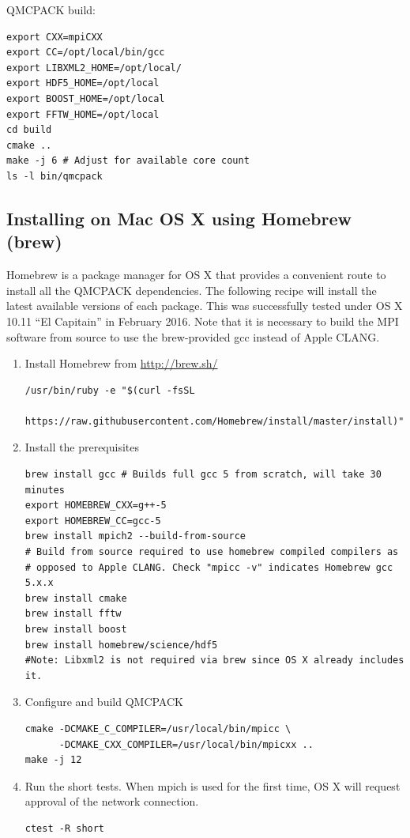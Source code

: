 QMCPACK build:
\begin{verbatim}
export CXX=mpiCXX
export CC=/opt/local/bin/gcc
export LIBXML2_HOME=/opt/local/
export HDF5_HOME=/opt/local
export BOOST_HOME=/opt/local
export FFTW_HOME=/opt/local
cd build
cmake ..
make -j 6 # Adjust for available core count
ls -l bin/qmcpack 
\end{verbatim}

\subsection{Installing on Mac OS X using Homebrew (brew)}
Homebrew is a package manager for OS X that provides a convenient
route to install all the QMCPACK dependencies. The
following recipe will install the latest available versions of each
package. This was successfully tested under OS X 10.11 ``El
Capitain'' in February 2016. Note that it is necessary to build the MPI software from
source to use the brew-provided gcc instead of Apple CLANG.

\begin{enumerate}
\item Install Homebrew from \url{http://brew.sh/}
\begin{verbatim}
/usr/bin/ruby -e "$(curl -fsSL 
    https://raw.githubusercontent.com/Homebrew/install/master/install)"
\end{verbatim}

\item Install the prerequisites
\begin{verbatim}
brew install gcc # Builds full gcc 5 from scratch, will take 30 minutes
export HOMEBREW_CXX=g++-5
export HOMEBREW_CC=gcc-5
brew install mpich2 --build-from-source
# Build from source required to use homebrew compiled compilers as
# opposed to Apple CLANG. Check "mpicc -v" indicates Homebrew gcc 5.x.x
brew install cmake
brew install fftw 
brew install boost
brew install homebrew/science/hdf5
#Note: Libxml2 is not required via brew since OS X already includes it.
\end{verbatim}
\item Configure and build QMCPACK
\begin{verbatim}
cmake -DCMAKE_C_COMPILER=/usr/local/bin/mpicc \
      -DCMAKE_CXX_COMPILER=/usr/local/bin/mpicxx ..
make -j 12
\end{verbatim}
\item Run the short tests. When mpich is used for the first time, OS
  X will request approval of the network connection.
\begin{verbatim}
ctest -R short
\end{verbatim}
\end{enumerate}

